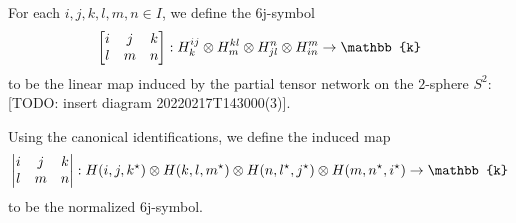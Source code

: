 \newcommand{\tenJSymbol}[8]{\begin{vmatrix}
    #1 & #2 & #3 & #4 \\
     * & #5 & #6 & #7 \\
    \tenJSymbolContinued #8 \\
  \end{vmatrix}_{10j}
}

\newcommand\tenJSymbolContinued[3]{
  * & * & #1 & #2 \\
  * & * & * & #3
}

\begin{definition}[$6$j-symbol]\label{def/6j-symbol}
  For each $i,j,k,l,m,n \in I$, we define the $6$j-symbol
  $$\sixJSymbol{i}{j}{k}{l}{m}{n}:
  H_{k}^{ij} \otimes H_{m}^{kl} \otimes H_{jl}^{n} \otimes H_{in}^{m} \to \mathbb{k}$$
  to be the linear map induced by the partial tensor network on
  the $2$-sphere $S^{2}$: [TODO: insert diagram
  20220217T143000(3)].

  \noindent Using the canonical identifications, we define the
  induced map
  $$\normalizedSixJSymbol{i}{j}{k}{l}{m}{n}: H(i,j,k^{\star}) \otimes H(k,l,m^{\star}) \otimes H(n,l^{\star},j^{\star}) \otimes H(m,n^{\star},i^{\star}) \to \mathbb{k}$$
  to be the normalized $6$j-symbol.
\end{definition}

